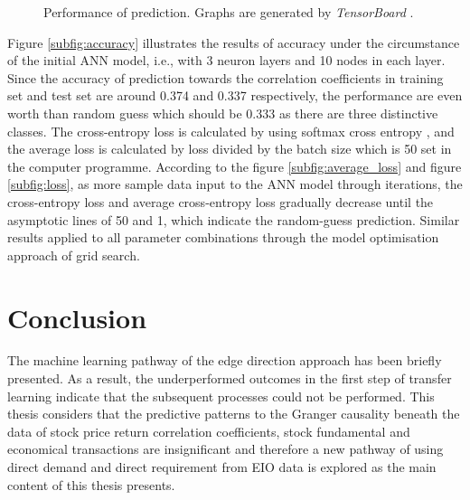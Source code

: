\begin{figure}
	
	\caption{Performance of prediction. Graphs are generated by \textit{TensorBoard} \cite{tensorflow2015-whitepaper}.}
	\label{fig:prediction}
\end{figure}

Figure \ref{subfig:accuracy} illustrates the results of accuracy under the circumstance of the initial ANN model, i.e., with 3 neuron layers and 10 nodes in each layer. Since the accuracy of prediction towards the correlation coefficients in training set and test set are around 0.374 and 0.337 respectively, the performance are even worth than random guess which should be 0.333 as there are three distinctive classes. The cross-entropy loss is calculated by using softmax cross entropy \cite{tensorflow2015-whitepaper}, and the average loss is calculated by loss divided by the batch size which is 50 set in the computer programme. According to the figure \ref{subfig:average_loss} and figure \ref{subfig:loss}, as more sample data input to the ANN model through iterations, the cross-entropy loss and average cross-entropy loss gradually decrease until the asymptotic lines of 50 and 1, which indicate the random-guess prediction. Similar results applied to all parameter combinations through the model optimisation approach of grid search.

\section{Conclusion}
The machine learning pathway of the edge direction approach has been briefly presented. As a result, the underperformed outcomes in the first step of transfer learning indicate that the subsequent processes could not be performed. This thesis considers that the predictive patterns to the Granger causality beneath the data of stock price return correlation coefficients, stock fundamental and economical transactions are insignificant and therefore a new pathway of using direct demand and direct requirement from EIO data is explored as the main content of this thesis presents.
